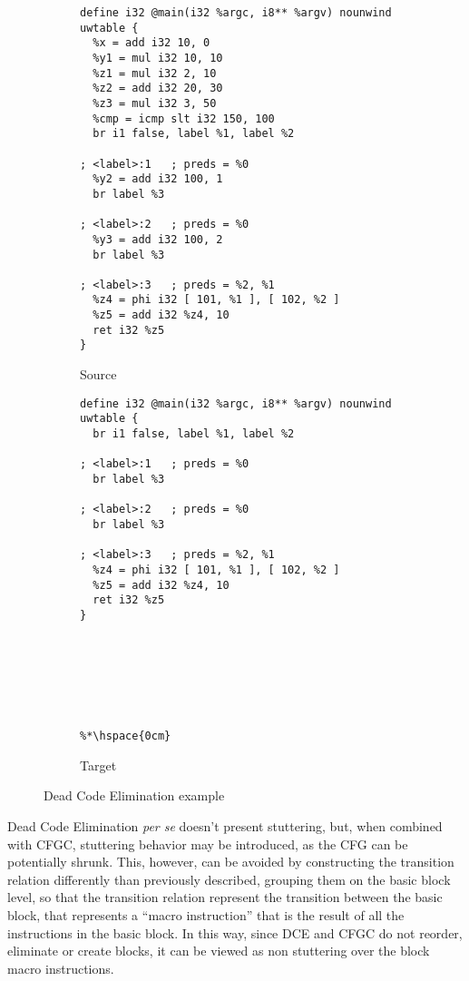 \begin{figure}[t]
  \begin{mdframed}
  \centering
  \begin{subfigure}[b]{0.49\textwidth}
    \centering
    \begin{lstlisting}
define i32 @main(i32 %argc, i8** %argv) nounwind uwtable {
  %x = add i32 10, 0
  %y1 = mul i32 10, 10
  %z1 = mul i32 2, 10
  %z2 = add i32 20, 30
  %z3 = mul i32 3, 50
  %cmp = icmp slt i32 150, 100
  br i1 false, label %1, label %2

; <label>:1   ; preds = %0
  %y2 = add i32 100, 1
  br label %3

; <label>:2   ; preds = %0
  %y3 = add i32 100, 2
  br label %3

; <label>:3   ; preds = %2, %1
  %z4 = phi i32 [ 101, %1 ], [ 102, %2 ]
  %z5 = add i32 %z4, 10
  ret i32 %z5
}
    \end{lstlisting}
    \caption{Source}
    \label{fig:sdce}
  \end{subfigure}
  \begin{subfigure}[b]{0.49\textwidth}
    \centering
    \begin{lstlisting}
define i32 @main(i32 %argc, i8** %argv) nounwind uwtable {
  br i1 false, label %1, label %2

; <label>:1   ; preds = %0
  br label %3

; <label>:2   ; preds = %0
  br label %3

; <label>:3   ; preds = %2, %1
  %z4 = phi i32 [ 101, %1 ], [ 102, %2 ]
  %z5 = add i32 %z4, 10
  ret i32 %z5
}







%*\hspace{0cm}
    \end{lstlisting}
    \caption{Target}
    \label{fig:tdce}
  \end{subfigure}
  \end{mdframed}
  \caption{Dead Code Elimination example}
  \label{fig:dce}
\end{figure}

Dead Code Elimination \emph{per se} doesn't present stuttering, but, when combined with CFGC, stuttering behavior may be introduced, as the CFG can be potentially shrunk. This, however, can be avoided by constructing the transition relation differently than previously described, grouping them on the basic block level, so that the transition relation represent the transition between the basic block, that represents a ``macro instruction'' that is the result of all the instructions in the basic block. In this way, since DCE and CFGC do not reorder, eliminate or create blocks, it can be viewed as non stuttering over the block macro instructions.

